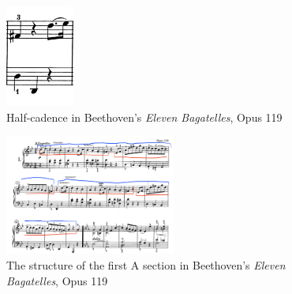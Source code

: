 \begin{figure}
	\centering
	\includegraphics[width=0.2\textwidth]{figures/beethoven-first-a-section-hc.jpg}
	\caption{Half-cadence in Beethoven's \textit{Eleven Bagatelles}, Opus 119}
	\label{fig:beethoven-first-a-section-hc}
\end{figure}

\begin{figure}
	\centering
	\includegraphics[width=0.5\textwidth]{figures/beethoven-first-a-section-structure.jpg}
	\caption{The structure of the first A section in Beethoven's \textit{Eleven Bagatelles}, Opus 119}
	\label{fig:beethoven-first-a-section-structure}
\end{figure}

